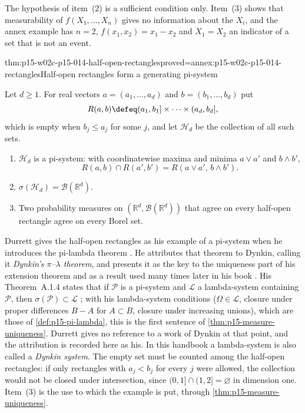 The hypothesis of item~(2) is a sufficient condition only. Item~(3)
shows that measurability of \(f(X_1,\ldots,X_n)\) gives no information
about the \(X_i\), and the annex example has \(n=2\),
\(f(x_1,x_2)=x_1-x_2\) and \(X_1=X_2\) an indicator of a set that is not
an event.

\begin{hblemma}{thm:p15-w02c-p15-014-half-open-rectangles}{proved=annex:p15-w02c-p15-014-rectangles}{Half-open rectangles form a generating pi-system}
\par\nobreak
Let \(d\geq1\). For real vectors \(a=(a_1,\ldots,a_d)\) and
\(b=(b_1,\ldots,b_d)\) put
\[
 R(a,b)\defeq(a_1,b_1]\times\cdots\times(a_d,b_d],
\]
which is empty when \(b_j\leq a_j\) for some \(j\), and let
\(\mathcal H_d\) be the collection of all such sets.
\begin{enumerate}
\item \(\mathcal H_d\) is a pi-system: with coordinatewise maxima and
      minima \(a\vee a'\) and \(b\wedge b'\),
      \[
       R(a,b)\cap R(a',b')=R(a\vee a',\,b\wedge b').
      \]
\item \(\sigma(\mathcal H_d)=\mathcal B(\mathbb R^d)\).
\item Two probability measures on \((\mathbb R^d,\mathcal B(\mathbb R^d))\)
      that agree on every half-open rectangle agree on every Borel set.
\end{enumerate}
\end{hblemma}

Durrett gives the half-open rectangles as his example of a pi-system
when he introduces the pi-lambda theorem
\cite[app.~A.1, p.~456]{DurrettPTEAuthor2019}. He attributes that
theorem to Dynkin, calling it \emph{Dynkin's \(\pi\)--\(\lambda\)
theorem}, and presents it as the key to the uniqueness part of his
extension theorem and as a result used many times later in his book
\cite[app.~A.1, p.~456]{DurrettPTEAuthor2019}. His Theorem~A.1.4 states
that if \(\mathcal P\) is a pi-system and \(\mathcal L\) a lambda-system
containing \(\mathcal P\), then \(\sigma(\mathcal P)\subset\mathcal L\)
\cite[Theorem~A.1.4, p.~456]{DurrettPTEAuthor2019}; with his lambda-system
conditions (\(\Omega\in\mathcal L\), closure under proper differences
\(B-A\) for \(A\subset B\), closure under increasing unions), which are
those of \cref{def:p15-pi-lambda}, this is the first sentence of
\cref{thm:p15-measure-uniqueness}. Durrett gives no reference to a work
of Dynkin at that point, and the attribution is recorded here as his.
In this handbook a lambda-system is also called a \emph{Dynkin system}.
The empty set must be counted among the half-open rectangles: if only
rectangles with \(a_j<b_j\) for every \(j\)
were allowed, the collection would not be closed under intersection,
since \((0,1]\cap(1,2]=\varnothing\) in dimension one. Item~(3) is the
use to which the example is put, through
\cref{thm:p15-measure-uniqueness}.

